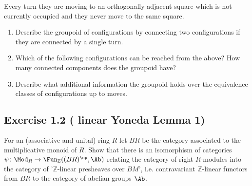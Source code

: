 Every turn they are moving to an orthogonally adjacent square which is not currently occupied and they never move to the same square.

\begin{enumerate}[label=(\alph*)]

    \item 
    Describe the groupoid of configurations by connecting two configurations if they are connected by a single turn.  
    
    \item 
    Which of the following configurations can be reached from the above? 
    How many connected components does the groupoid have?
    \begin{center}
        \qquad
    \end{center}

    \item 

    Describe what additional information the groupoid holds over the equivalence classes of configurations up to moves.
    
\end{enumerate}

\subsection{ Exercise 1.2 ( linear Yoneda Lemma 1) }

For an (associative and unital) ring $ R $ let $ B R $ be the category associated to the multiplicative monoid of $ R $.
Show that there is an isomorphism of categories $ \psi \colon \Mod_R \to \Fun_{ \mathbb{ Z } } ( ( B R )^{ \op } , \Ab ) $ relating the category of right $ R $-modules into the category of '$ \mathbb{ Z } $-linear presheaves over $ B M $', i.e. contravariant $ \mathbb{ Z } $-linear functors from $ B R $ to the category of abelian groups $ \Ab $.

